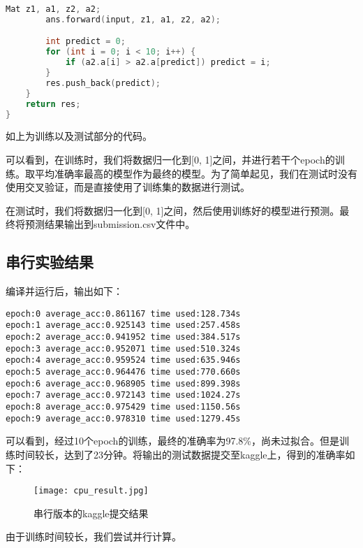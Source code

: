 \documentclass{ctexart}
\begin{document}
\begin{sloppypar}
\begin{lstlisting}[language=C++]
        Mat z1, a1, z2, a2;
        ans.forward(input, z1, a1, z2, a2);

        int predict = 0;
        for (int i = 0; i < 10; i++) {
            if (a2.a[i] > a2.a[predict]) predict = i;
        }
        res.push_back(predict);
    }
    return res;
}
\end{lstlisting}
如上为训练以及测试部分的代码。

可以看到，在训练时，我们将数据归一化到[0, 1]之间，并进行若干个epoch的训练。取平均准确率最高的模型作为最终的模型。为了简单起见，我们在测试时没有使用交叉验证，而是直接使用了训练集的数据进行测试。

在测试时，我们将数据归一化到[0, 1]之间，然后使用训练好的模型进行预测。最终将预测结果输出到submission.csv文件中。

\subsection{串行实验结果}
编译并运行后，输出如下：
\begin{lstlisting}
epoch:0 average_acc:0.861167 time used:128.734s
epoch:1 average_acc:0.925143 time used:257.458s
epoch:2 average_acc:0.941952 time used:384.517s
epoch:3 average_acc:0.952071 time used:510.324s
epoch:4 average_acc:0.959524 time used:635.946s
epoch:5 average_acc:0.964476 time used:770.660s
epoch:6 average_acc:0.968905 time used:899.398s
epoch:7 average_acc:0.972143 time used:1024.27s
epoch:8 average_acc:0.975429 time used:1150.56s
epoch:9 average_acc:0.978310 time used:1279.45s
\end{lstlisting}
可以看到，经过10个epoch的训练，最终的准确率为97.8\%，尚未过拟合。但是训练时间较长，达到了23分钟。将输出的测试数据提交至kaggle上，得到的准确率如下：
\begin{figure}[H]
    \centering
    \texttt{[image: cpu\_result.jpg]}
    \caption{串行版本的kaggle提交结果}
\end{figure}
由于训练时间较长，我们尝试并行计算。

\end{sloppypar}
\end{document}
